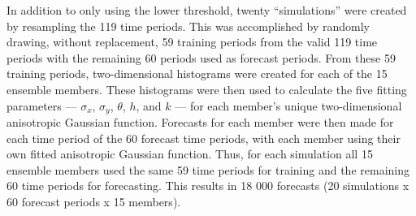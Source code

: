 In addition to only using the lower threshold, twenty ``simulations'' were created by resampling the 119 time periods.
This was accomplished by randomly drawing, without replacement, 59 training periods from the valid 119 time periods with the remaining 60 periods used as forecast periods.
From these 59 training periods, two-dimensional histograms were created for each of the 15 ensemble members.
These histograms were then used to calculate the five fitting parameters --- $\sigma_x$, $\sigma_y$, $\theta$, $h$, and $k$ --- for each member's unique two-dimensional anisotropic Gaussian function.
Forecasts for each member were then made for each time period of the 60 forecast time periods, with each member using their own fitted anisotropic Gaussian function.
Thus, for each simulation all 15 ensemble members used the same 59 time periods for training and the remaining 60 time periods for forecasting.
This results in 18 000 forecasts (20 simulations x 60 forecast periods x 15 members).






